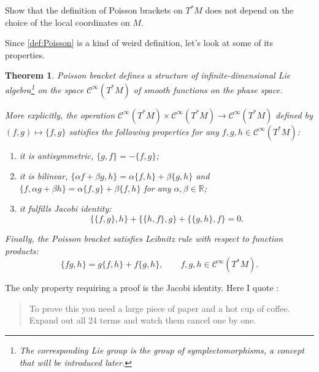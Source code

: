 \documentclass[english,fontsize=11pt,paper=a5,oneside]{scrbook}
\newcommand{\cC}{\mathcal{C}}
\newcommand{\R}{\mathbb{R}}
\newtheorem{theorem}{Theorem}[chapter]
\theoremstyle{definition}
\newenvironment{exercise}
  {\pushQED{\qed}\renewcommand{\qedsymbol}{$\maltese$}\exercisex}
  {\popQED\endexercisex}
\begin{document}
\begin{exercise}
  Show that the definition of Poisson brackets on $T^*M$ does not depend on the choice of the local coordinates on $M$.
\end{exercise}

Since \ref{def:Poisson} is a kind of weird definition, let's look at some of its properties.

\begin{theorem}\label{thm:PoissonLieAlgebra}
  Poisson bracket defines a structure of infinite-dimensional Lie algebra\footnote{The corresponding Lie group is the group of symplectomorphisms, a concept that will be introduced later.} on the space $\cC^\infty(T^*M)$ of smooth functions on the phase space.

  More explicitly, the operation $\cC^\infty(T^*M)\times \cC^\infty(T^*M) \to \cC^\infty(T^*M)$ defined by $(f,g) \mapsto \big\{f,g\big\}$ satisfies the following properties for any $f,g,h \in \cC^\infty(T^*M)$:
  \begin{enumerate}
    \item it is antisymmetric, $\big\{g,f\big\} = - \big\{f,g\big\}$;
    \item it is bilinear, $\big\{\alpha f + \beta g, h\big\} = \alpha\big\{f,h\big\} + \beta\big\{g,h\big\}$ and $\big\{f, \alpha g + \beta h\big\} = \alpha\big\{f,g\big\} + \beta\big\{f,h\big\}$ for any $\alpha, \beta \in\R$;
    \item it fulfills \emph{Jacobi identity}:
          \begin{equation}\label{eq:JacobiId}
            \big\{\big\{f,g\big\},h\big\} + \big\{\big\{h,f\big\},g\big\} + \big\{\big\{g,h\big\},f\big\} = 0.
          \end{equation}
  \end{enumerate}
  Finally, the Poisson bracket satisfies \emph{Leibnitz rule} with respect to function products:
  \begin{equation}\label{eq:LeibnitzId}
    \big\{fg, h\big\} = g\big\{f, h\big\} + f \big\{g, h\big\}, \qquad f,g,h \in \cC^\infty(T^*M).
  \end{equation}
\end{theorem}

The only property requiring a proof is the Jacobi identity.
Here I quote \cite{lectures:tong}:
\begin{quote}
  To prove this you need a large piece of paper and a hot cup of coffee. Expand out all 24 terms and watch them cancel one by one.
\end{quote}
\end{document}
